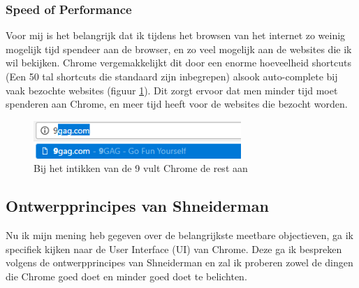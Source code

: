 \documentclass[12pt]{article}
\begin{document}
\subsubsection{Speed of Performance}
Voor mij is het belangrijk dat ik tijdens het browsen van het internet zo weinig mogelijk tijd spendeer aan de browser, en zo veel mogelijk aan de websites die ik wil bekijken. Chrome vergemakkelijkt dit door een enorme hoeveelheid shortcuts (Een 50 tal shortcuts die standaard zijn inbegrepen\cite{shortcuts}) alsook auto-complete bij vaak bezochte websites (figuur \ref{fig:autocomplete}). Dit zorgt ervoor dat men minder tijd moet spenderen aan Chrome, en meer tijd heeft voor de websites die bezocht worden.
\begin{figure}
	\centering
	\includegraphics[width=0.7\textwidth]{autocomplete.png}
	\caption{Bij het intikken van de 9 vult Chrome de rest aan}
	\label{fig:autocomplete}
\end{figure}

\subsection{Ontwerpprincipes van Shneiderman}
Nu ik mijn mening heb gegeven over de belangrijkste meetbare objectieven, ga ik specifiek kijken naar de User Interface (UI) van Chrome. Deze ga ik bespreken volgens de ontwerpprincipes van Shneiderman en zal ik proberen zowel de dingen die Chrome goed doet en minder goed doet te belichten.
\end{document}
